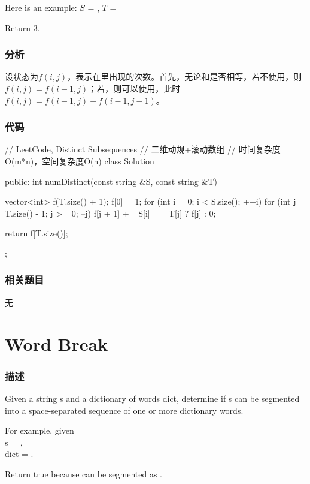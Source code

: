 Here is an example:
$S$ = , $T$ = 

Return 3.


\subsubsection{分析}
设状态为$f(i,j)$，表示在里出现的次数。首先，无论和是否相等，若不使用，则$f(i,j)=f(i-1,j)$；若，则可以使用，此时$f(i,j)=f(i-1,j)+f(i-1, j-1)$。


\subsubsection{代码}
\begin{Code}
// LeetCode, Distinct Subsequences
// 二维动规+滚动数组
// 时间复杂度O(m*n)，空间复杂度O(n)
class Solution {
public:
    int numDistinct(const string &S, const string &T) {
        vector<int> f(T.size() + 1);
        f[0] = 1;
        for (int i = 0; i < S.size(); ++i) {
            for (int j = T.size() - 1; j >= 0; --j) {
                f[j + 1] += S[i] == T[j] ? f[j] : 0;
            }
        }

        return f[T.size()];
    }
};
\end{Code}


\subsubsection{相关题目}
\begindot
\item 无
\myenddot


\section{Word Break} %
\label{sec:word-break}


\subsubsection{描述}
Given a string s and a dictionary of words dict, determine if s can be segmented into a space-separated sequence of one or more dictionary words.

For example, given \\
s = ,\\
dict = .

Return true because  can be segmented as .


